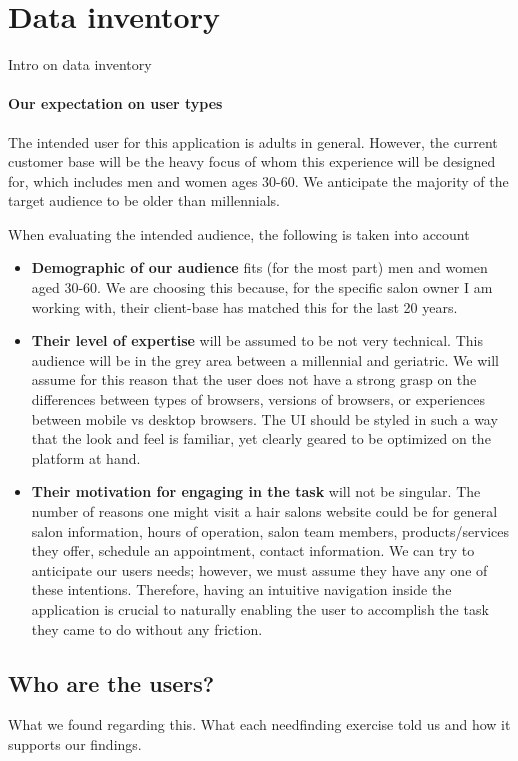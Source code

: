 \section{Data inventory}
Intro on data inventory

\paragraph{Our expectation on user types}
The intended user for this application is adults in general. However, the current customer base will be the heavy focus of whom this experience will be designed for, which includes men and women ages 30-60. We anticipate the majority of the target audience to be older than millennials.

When evaluating the intended audience, the following is taken into account

\begin{itemize}
\item
  \textbf{Demographic of our audience} fits (for the most part) men and women aged 30-60. We are choosing this because, for the specific salon owner I am working with, their client-base has matched this for the last 20 years.
\item
  \textbf{Their level of expertise} will be assumed to be not very technical. This audience will be in the grey area between a millennial and geriatric. We will assume for this reason that the user does not have a strong grasp on the differences between types of browsers, versions of browsers, or experiences between mobile vs desktop browsers. The UI should be styled in such a way that the look and feel is familiar, yet clearly geared to be optimized on the platform at hand.
\item
  \textbf{Their motivation for engaging in the task} will not be singular. The number of reasons one might visit a hair salons website could be for general salon information, hours of operation, salon team members, products/services they offer, schedule an appointment, contact information. We can try to anticipate our users needs; however, we must assume they have any one of these intentions. Therefore, having an intuitive navigation inside the application is crucial to naturally enabling the user to accomplish the task they came to do without any friction.
\end{itemize}

\subsection{Who are the users?}
What we found regarding this. What each needfinding exercise told us and how it supports our findings.

